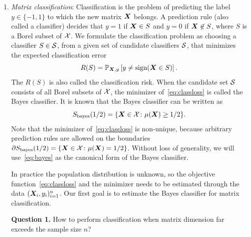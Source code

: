 \documentclass[11pt]{article}
\theoremstyle{plain}
\theoremstyle{definition}
\def\sign{\textup{sign}}
\def\bayesS{S_{\textup{bayes}}}
\begin{document}
\begin{enumerate}[label={2.\arabic*},wide, labelwidth=!, labelindent=0pt]
\item {\it Matrix classification}: Classification is the problem of predicting the label $y\in \{-1,1\}$ to which the new matrix $\bm X$ belongs. A prediction rule (also called a classifier) decides that $y=1$ if $\bm X\in S$ and $y=0$ if $\bm X \not\in S$, where $S$ is a Borel subset of $\mathcal{X}$. We formulate the classification problem as choosing a classifier $S\in \mathcal{S}$, from a given set of candidate classifiers $\mathcal{S}$, that minimizes the expected classification error 
\begin{equation}\label{eq:classloss}
R(S)=\mathbb{P}_{\mX,y}\left[y\neq \sign(\mX\in S)\right].
\end{equation}
The $R(S)$ is also called the classification risk. When the candidate set $\mathcal{S}$ consists of all Borel subsets of $\mathcal{X}$, the minimizer of~\eqref{eq:classloss} is called the Bayes classifier. It is known that the Bayes classifier can be written as 
\begin{equation}\label{eq:bayes}
\bayesS(1/2)=\{\mX\in \tX \colon \mu(\mX)\geq 1/2\}.
\end{equation}
Note that the minimizer of~\eqref{eq:classloss} is non-unique, because arbitrary prediction rules are allowed on the boundaries $\partial S_{\text{bayes}}(1/2) = \{\bm X\in \mathcal{X}\colon \mu(\bm X)=1/2\}$. Without loss of generality, we will use~\eqref{eq:bayes} as the canonical form of the Bayes classifier. 

In practice the population distribution is unknown, so the objective function~\eqref{eq:classloss} and the minimizer needs to be estimated through the data $(\bm X_i,y_i)_{i=1}^n$. Our first goal is to estimate the Bayes classifier for matrix classification. 

{\bf Question 1.} How to perform classification when matrix dimension far exceeds the sample size $n$?


\end{enumerate}
\end{document}
